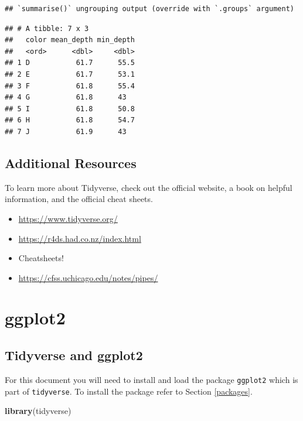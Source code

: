 \documentclass[
]{book}
\newenvironment{Shaded}{\begin{snugshade}}{\end{snugshade}}
\newcommand{\KeywordTok}[1]{\textcolor[rgb]{0.13,0.29,0.53}{\textbf{#1}}}
\newcommand{\NormalTok}[1]{#1}
\begin{document}
\begin{verbatim}
## `summarise()` ungrouping output (override with `.groups` argument)
\end{verbatim}

\begin{verbatim}
## # A tibble: 7 x 3
##   color mean_depth min_depth
##   <ord>      <dbl>     <dbl>
## 1 D           61.7      55.5
## 2 E           61.7      53.1
## 3 F           61.8      55.4
## 4 G           61.8      43  
## 5 I           61.8      50.8
## 6 H           61.8      54.7
## 7 J           61.9      43
\end{verbatim}

\hypertarget{additional-resources-7}{%
\section*{Additional Resources}\label{additional-resources-7}}

To learn more about Tidyverse, check out the official website, a book on helpful information, and the official cheat sheets.

\begin{itemize}
\item
  \url{https://www.tidyverse.org/}
\item
  \url{https://r4ds.had.co.nz/index.html}
\item
  Cheatsheets!
\item
  \url{https://cfss.uchicago.edu/notes/pipes/}
\end{itemize}

\hypertarget{ggplot2}{%
\chapter{ggplot2}\label{ggplot2}}

\hypertarget{tidyverse-and-ggplot2}{%
\section{Tidyverse and ggplot2}\label{tidyverse-and-ggplot2}}

For this document you will need to install and load the package \texttt{ggplot2} which is part of \texttt{tidyverse}. To install the package refer to Section \ref{packages}.

\begin{Shaded}
\begin{Highlighting}[]
\KeywordTok{library}\NormalTok{(tidyverse)}
\end{Highlighting}
\end{Shaded}
\end{document}
